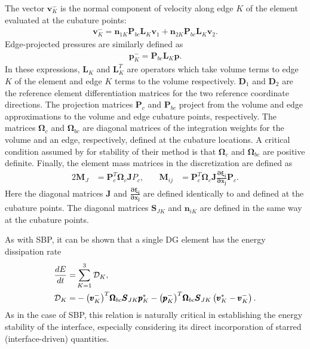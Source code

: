 The vector $\pmb{v}_{K}^{-}$ is the normal component of velocity along
edge $K$ of the element evaluated at the cubature points:
\begin{align}
  \pmb{v}^{-}_{K} = \pmb{n}_{1K} \pmb{P}_{bc} \pmb{L}_{K} \pmb{v}_{1}
  + \pmb{n}_{2K} \pmb{P}_{bc} \pmb{L}_{K} \pmb{v}_{2}.
\end{align}
Edge-projected pressures are similarly defined as
\begin{align}
  \pmb{p}_{K}^{-} = \pmb{P}_{bc}\pmb{L}_{K} \pmb{p}.
\end{align}
In these expressions, $\pmb{L}_{K}$ and $\pmb{L}_{K}^{T}$ are operators
which take volume terms to edge $K$ of the element and edge $K$ terms to
the volume respectively. $\pmb{D}_{1}$ and $\pmb{D}_{2}$ are the reference
element differentiation matrices for the two reference coordinate directions.
The projection matrices $\pmb{P}_{c}$ and $\pmb{P}_{bc}$ project from the volume and edge
approximations to the volume and edge cubature points, respectively. The matrices
$\pmb{\Omega}_{c}$ and $\pmb{\Omega}_{bc}$ are diagonal matrices of the integration weights for
the volume and an edge, respectively, defined at the cubature locations. A critical
condition assumed by \cite{kozdon2016stable} for stability of their method is that
$\pmb{\Omega}_{c}$ and $\pmb{\Omega}_{bc}$ are positive definite. Finally, the
element mass matrices in the discretization are defined as
\begin{alignat}{2}
  \pmb{M}_{J}  &= \pmb{P}_{c}^{T} \pmb{\Omega}_{c} \pmb{J} P_{c},\quad&
  \pmb{M}_{ij} &= \pmb{P}_{c}^{T} \pmb{\Omega}_{c} \pmb{J}
		  \frac{\pmb{\partial \xi_{i}}}{\pmb{\partial x_{j}}} \pmb{P}_{c}.
\end{alignat}
Here the diagonal matrices $\pmb{J}$ and $\pmb{\frac{\partial \xi_{i}}{\partial x_{j}}}$
are defined identically to  and defined at the cubature points.
The diagonal matrices $\pmb{S}_{JK}$ and $\pmb{n}_{iK}$ are defined in the same way at the cubature
points.

As with SBP, it can be shown that a single DG element has
the energy dissipation rate
\begin{align}
  \frac{dE}{dt} = & \sum_{K=1}^{3} \mathcal{D}_{K},\\
  \mathcal{D}_{K} = &
  - {\left(\pmb{v}_{K}^{-}\right)}^{T}\pmb{\Omega}_{bc}\pmb{S}_{JK}\pmb{p}_{K}^{*}
  - {\left(\pmb{p}_{K}^{-}\right)}^{T}\pmb{\Omega}_{bc}\pmb{S}_{JK}
  \left(\pmb{v}^{*}_{K} - \pmb{v}^{-}_{K}\right). \label{eq:dg_diss}
\end{align}
As in the case of SBP, this relation is naturally critical in establishing the
energy stability of the interface, especially considering its direct incorporation
of starred (interface-driven) quantities.


